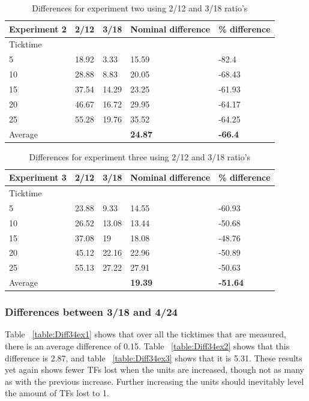 \begin{table}[!htbp]
\begin{tabular}{| l | l | l | l | l |}
\hline
Experiment 2 & 2/12 & 3/18 & Nominal difference & \% difference \\ \hline
Ticktime &&&& \\ \hline
5 & 18.92 & 3.33 & 15.59 & -82.4 \\ \hline
10 & 28.88 & 8.83 & 20.05 & -68.43 \\ \hline
15 & 37.54 & 14.29 & 23.25 & -61.93 \\ \hline
20 & 46.67 & 16.72 & 29.95 & -64.17 \\ \hline
25 & 55.28 & 19.76 & 35.52 & -64.25 \\ \hline \hline
Average &&& \textbf{24.87} & \textbf{-66.4} \\ \hline
\end{tabular}
\caption{Differences for experiment two using 2/12 and 3/18 ratio's}
\label{table:Diff23ex2}
\end{table}

\begin{table}[!htbp]
\begin{tabular}{| l | l | l | l | l |}
\hline
Experiment 3 & 2/12 & 3/18 & Nominal difference & \% difference \\ \hline
Ticktime &&&& \\ \hline
5 & 23.88 & 9.33 & 14.55 & -60.93 \\ \hline
10 & 26.52 & 13.08 & 13.44 & -50.68 \\ \hline
15 & 37.08 & 19 & 18.08 & -48.76 \\ \hline
20 & 45.12 & 22.16 & 22.96 & -50.89 \\ \hline
25 & 55.13 & 27.22 & 27.91 & -50.63 \\ \hline \hline
Average &&& \textbf{19.39} & \textbf{-51.64} \\ \hline
\end{tabular}
\caption{Differences for experiment three using 2/12 and 3/18 ratio's}
\label{table:Diff23ex3}
\end{table}

\subsubsection*{Differences between 3/18 and 4/24}
Table ~\ref{table:Diff34ex1} shows that over all the ticktimes that are measured, there is an average difference of 0.15. Table ~\ref{table:Diff34ex2} shows that this difference is 2.87, and table ~\ref{table:Diff34ex3} shows that it is 5.31. These results yet again shows fewer TFs lost when the units are increased, though not as many as with the previous increase. Further increasing the units should inevitably level the amount of TFs lost to 1.

